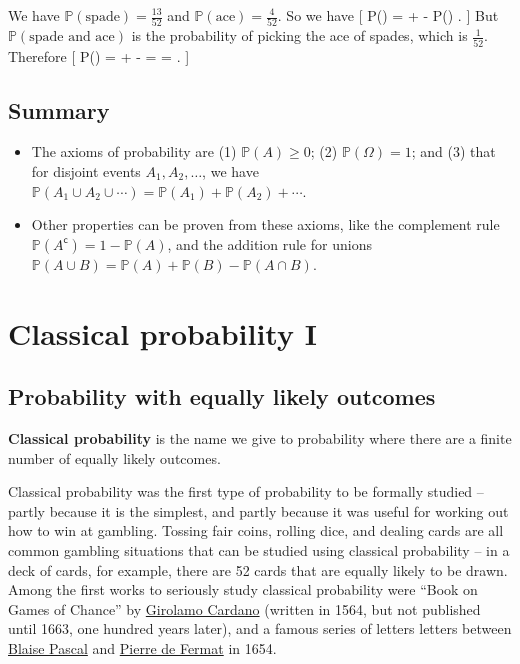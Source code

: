 \documentclass[
  letterpaper,
  DIV=11,
  numbers=noendperiod]{scrreprt}
\providecommand{\tightlist}{%
  \setlength{\itemsep}{0pt}\setlength{\parskip}{0pt}}\usepackage{longtable,booktabs,array}
\theoremstyle{remark}
\begin{document}
We have \(\mathbb P(\text{spade}) = \frac{13}{52}\) and
\(\mathbb P(\text{ace}) = \frac{4}{52}\). So we have {[}
\mathbb P() =  +  -
\mathbb P() . {]} But
\(\mathbb P(\text{spade and ace})\) is the probability of picking the
ace of spades, which is \(\frac{1}{52}\). Therefore {[}
\mathbb P() =  +  -
 =  =  . {]}

\hypertarget{summary-L04}{%
\section*{Summary}\label{summary-L04}}


\begin{itemize}
\tightlist
\item
  The axioms of probability are (1) \(\mathbb P(A) \geq 0\); (2)
  \(\mathbb P(\Omega) = 1\); and (3) that for disjoint events
  \(A_1, A_2, \dots\), we have
  \(\mathbb P(A_1 \cup A_2 \cup \cdots) = \mathbb P(A_1) + \mathbb P(A_2) + \cdots\).
\item
  Other properties can be proven from these axioms, like the complement
  rule \(\mathbb P(A^\mathsf{c}) = 1 - \mathbb P(A)\), and the addition
  rule for unions
  \(\mathbb P(A \cup B) = \mathbb P(A) + \mathbb P(B) - \mathbb P(A \cap B)\).
\end{itemize}

\hypertarget{L05-classical-i}{%
\chapter{Classical probability I}\label{L05-classical-i}}

\hypertarget{classical-intro}{%
\section{Probability with equally likely
outcomes}\label{classical-intro}}

\textbf{Classical probability} is the name we give to probability where
there are a finite number of equally likely outcomes.

Classical probability was the first type of probability to be formally
studied -- partly because it is the simplest, and partly because it was
useful for working out how to win at gambling. Tossing fair coins,
rolling dice, and dealing cards are all common gambling situations that
can be studied using classical probability -- in a deck of cards, for
example, there are 52 cards that are equally likely to be drawn. Among
the first works to seriously study classical probability were ``Book on
Games of Chance'' by
\href{https://mathshistory.st-andrews.ac.uk/Biographies/Cardan/}{Girolamo
Cardano} (written in 1564, but not published until 1663, one hundred
years later), and a famous series of letters letters between
\href{https://mathshistory.st-andrews.ac.uk/Biographies/Pascal/}{Blaise
Pascal} and
\href{https://mathshistory.st-andrews.ac.uk/Biographies/Fermat/}{Pierre
de Fermat} in 1654.
\end{document}
